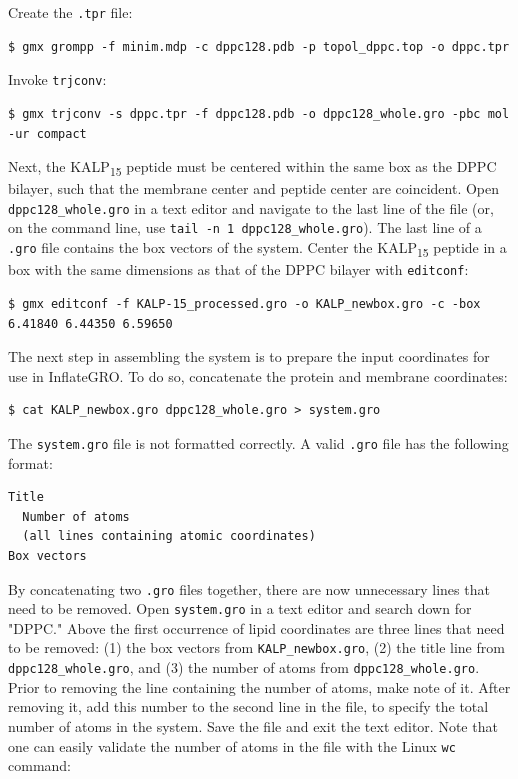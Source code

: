 \documentclass[9pt,tutorial,pubversion]{livecoms}
\begin{document}
Create the \texttt{.tpr} file:

\begin{lstlisting}
$ gmx grompp -f minim.mdp -c dppc128.pdb -p topol_dppc.top -o dppc.tpr
\end{lstlisting}

Invoke \texttt{trjconv}:

\begin{lstlisting}
$ gmx trjconv -s dppc.tpr -f dppc128.pdb -o dppc128_whole.gro -pbc mol -ur compact
\end{lstlisting}

Next, the KALP\textsubscript{15} peptide must be centered within the same box as the DPPC bilayer, such that the membrane center and peptide center are coincident. Open \texttt{dppc128\_whole.gro} in a text editor and navigate to the last line of the file (or, on the command line, use \texttt{tail -n 1 dppc128\_whole.gro}). The last line of a \texttt{.gro} file contains the box vectors of the system. Center the KALP\textsubscript{15} peptide in a box with the same dimensions as that of the DPPC bilayer with \texttt{editconf}:

\begin{lstlisting}
$ gmx editconf -f KALP-15_processed.gro -o KALP_newbox.gro -c -box 6.41840 6.44350 6.59650
\end{lstlisting}

The next step in assembling the system is to prepare the input coordinates for use in InflateGRO. To do so, concatenate the protein and membrane coordinates:

\begin{lstlisting}
$ cat KALP_newbox.gro dppc128_whole.gro > system.gro
\end{lstlisting}

The \texttt{system.gro} file is not formatted correctly. A valid \texttt{.gro} file has the following format:

\begin{lstlisting}
Title
  Number of atoms
  (all lines containing atomic coordinates)
Box vectors
\end{lstlisting}

By concatenating two \texttt{.gro} files together, there are now unnecessary lines that need to be removed. Open \texttt{system.gro} in a text editor and search down for "DPPC." Above the first occurrence of lipid coordinates are three lines that need to be removed: (1) the box vectors from \texttt{KALP\_newbox.gro}, (2) the title line from \texttt{dppc128\_whole.gro}, and (3) the number of atoms from \texttt{dppc128\_whole.gro}. Prior to removing the line containing the number of atoms, make note of it. After removing it, add this number to the second line in the file, to specify the total number of atoms in the system. Save the file and exit the text editor. Note that one can easily validate the number of atoms in the file with the Linux \texttt{wc} command:
\end{document}
